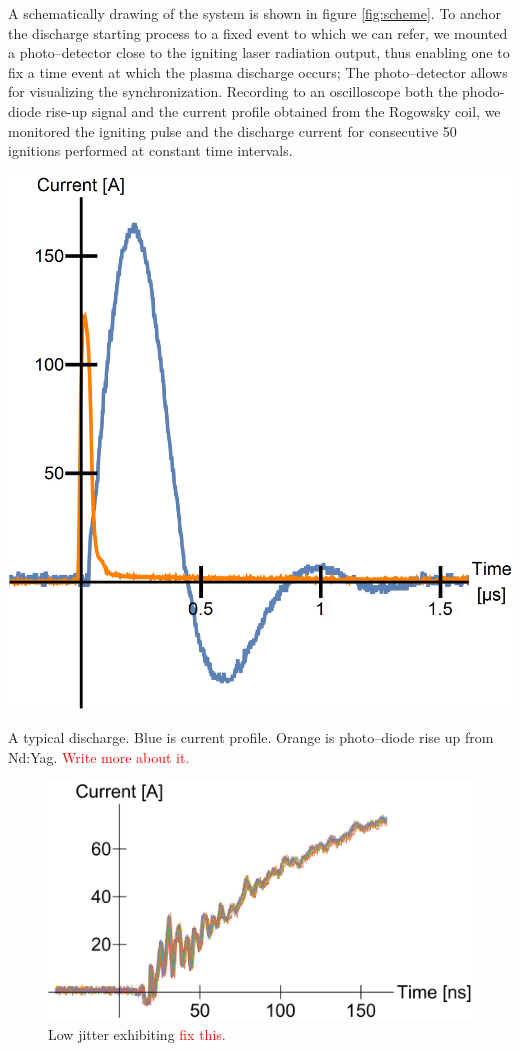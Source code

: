\documentclass[justified,nofonts,nobib]{tufte-book}
\begin{document}
A schematically drawing of the system is shown in figure \ref{fig:scheme}. To anchor the discharge starting process to a fixed event to which we can refer, we mounted a photo--detector close to the igniting laser radiation output, thus enabling one to fix a time event at which the plasma discharge occurs; The photo--detector allows for visualizing the synchronization. Recording to an oscilloscope both the phodo-diode rise-up signal and the current profile obtained from the Rogowsky coil, we monitored the igniting pulse and the discharge current for consecutive 50 ignitions performed at constant time intervals.\begin{marginfigure}
    \includegraphics[width=\marginparwidth]{figures/jitter/discharge_sample.png}
    \caption{A typical discharge. Blue is current profile. Orange is photo--diode rise up from Nd:Yag. \textcolor{red}{Write more about it.}}
    \label{discharge_sample}
\end{marginfigure}
\begin{figure}
    \centering
    \includegraphics[width=\textwidth]{figures/jitter/low_jitter.pdf}
    \caption{Low jitter exhibiting \textcolor{red}{fix this.}}
    \label{fig:low_jitter}
\end{figure}
\end{document}
